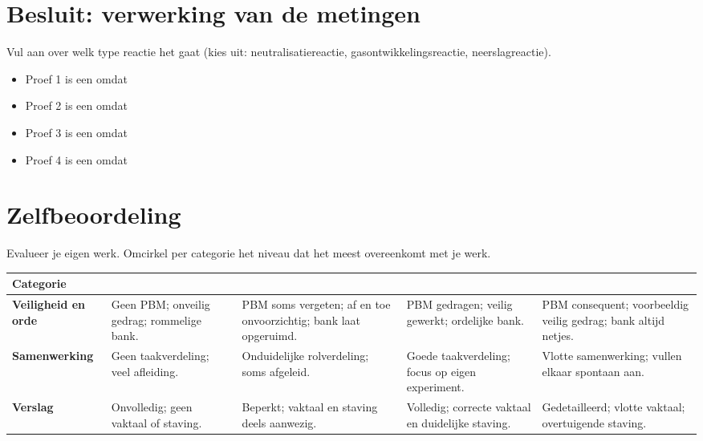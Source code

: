 \documentclass[a4paper, 11pt]{article}
\begin{document}
\vspace{0.8cm}
\section{Besluit: verwerking van de metingen}
Vul aan over welk type reactie het gaat (kies uit: neutralisatiereactie, gasontwikkelingsreactie, neerslagreactie).

\vspace{0.4cm}
\begin{itemize}[label=--, itemsep=0.4cm, leftmargin=1.5cm]
    \item Proef 1 is een \makebox[5cm]{\dotfill} omdat \dotfill
    \item Proef 2 is een \makebox[5cm]{\dotfill} omdat \dotfill
    \item Proef 3 is een \makebox[5cm]{\dotfill} omdat \dotfill
    \item Proef 4 is een \makebox[5cm]{\dotfill} omdat \dotfill
\end{itemize}

\vspace{0.4cm}
\section{Zelfbeoordeling}
Evalueer je eigen werk. Omcirkel per categorie het niveau dat het meest overeenkomt met je werk.

\vspace{0.3cm}
{\small
\renewcommand{\arraystretch}{1.4}
\setlength{\tabcolsep}{4pt}
\begin{tabularx}{\textwidth}{|p{2cm}|X|X|X|X|}
\hline
\rowcolor{gray!15}
\textbf{Categorie}
  & \cellcolor{red!20}{\scriptsize Onvoldoende}
  & \cellcolor{orange!20}{\scriptsize Te verbeteren}
  & \cellcolor{yellow!20}{\scriptsize Naar behoren}
  & \cellcolor{green!20}{\scriptsize Uitstekend} \\
\hline
\textbf{Veiligheid en orde}
  & Geen PBM; onveilig gedrag; rommelige bank.
  & PBM soms vergeten; af en toe onvoorzichtig; bank laat opgeruimd.
  & PBM gedragen; veilig gewerkt; ordelijke bank.
  & PBM consequent; voorbeeldig veilig gedrag; bank altijd netjes. \\
\hline
\textbf{Samen\-werking}
  & Geen taakverdeling; veel afleiding.
  & Onduidelijke rolverdeling; soms afgeleid.
  & Goede taakverdeling; focus op eigen experiment.
  & Vlotte samenwerking; vullen elkaar spontaan aan. \\
\hline
\textbf{Verslag}
  & Onvolledig; geen vaktaal of staving.
  & Beperkt; vaktaal en staving deels aanwezig.
  & Volledig; correcte vaktaal en duidelijke staving.
  & Gedetailleerd; vlotte vaktaal; overtuigende staving. \\
\hline
\end{tabularx}
\renewcommand{\arraystretch}{1}
}
\end{document}
